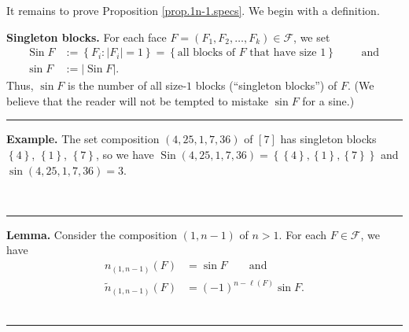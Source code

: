 \documentclass[12pt]{article}
\theoremstyle{definition}%
\newtheorem{lem}[thm]{Lemma}
\theoremstyle{definition}%
\newtheorem{defn}[thm]{Definition}
\newtheorem{exmp}[thm]{Example}
\theoremstyle{remark}%
\newcommand{\tup}[1]{\left( #1 \right)}
\newcommand{\interval}[1]{\left[ #1 \right]} %
\newcommand{\set}[1]{\left\{ #1 \right\}}
\newcommand{\card}[1]{\left| #1 \right|} %
\newcommand{\CF}{\mathcal{F}}
\newcommand{\nA}{n_{ \tup{1,n-1} } }%
\newcommand{\nn}{\widetilde{n}}%
\newcommand{\Sin}{\operatorname{Sin}}
\newcommand{\defin}[1]{\textbf{#1}}
\newenvironment{lem}[1][Lemma]{\noindent\textbf{#1.} }{\ \rule{0.5em}{0.5em}}
\newenvironment{defn}[1][Definition]{\noindent\textbf{#1.} }{\ \rule{0.5em}{0.5em}}
\newenvironment{exmp}[1][Example]{\noindent\textbf{#1.} }{\ \rule{0.5em}{0.5em}}
\begin{document}
It remains to prove Proposition \ref{prop.1n-1.specs}. We begin with a definition.

\begin{defn}[Singleton blocks]
    For each face $F = \tup{F_1, F_2, \ldots, F_k} \in \CF$,
    we set
    \begin{align*}
    \Sin F &:= \set{F_i : \card{F_i} = 1}
	= \set{\text{all blocks of $F$ that have size $1$}}
    \qquad \text{ and } \\
    \sin F &:= \card{\Sin F}.
    \end{align*}
    Thus, $\sin F$ is the number of all size-$1$ blocks (``singleton blocks'') of $F$.
    (We believe that the reader will not be tempted to mistake $\sin F$ for a sine.)
\end{defn}
\begin{exmp}
The set composition $\tup{4, 25, 1, 7, 36}$ of $\interval{7}$ has singleton blocks $\set{4}$, $\set{1}$, $\set{7}$, so we have $\Sin\tup{4, 25, 1, 7, 36} = \set{\set{4},\set{1},\set{7}}$ and $\sin\tup{4, 25, 1, 7, 36} = 3$.


\end{exmp}

\begin{lem}
    \label{lem.spec.form}
    Consider the composition $\tup{1, n-1}$ of $n>1$.
	For each $F \in \CF$, we have
    \begin{align}
        \nA\tup{ F } &= \sin F
		\qquad \text{and}
		\label{eq.lem.spec.form.na}
		\\
		\nn_{\tup{1,n-1}}\tup{F}
		&= \tup{ -1 }^{n-\ell\tup{ F }} \sin F.
		\label{eq.lem.spec.form.nna}
    \end{align}
\end{lem}
\end{document}
